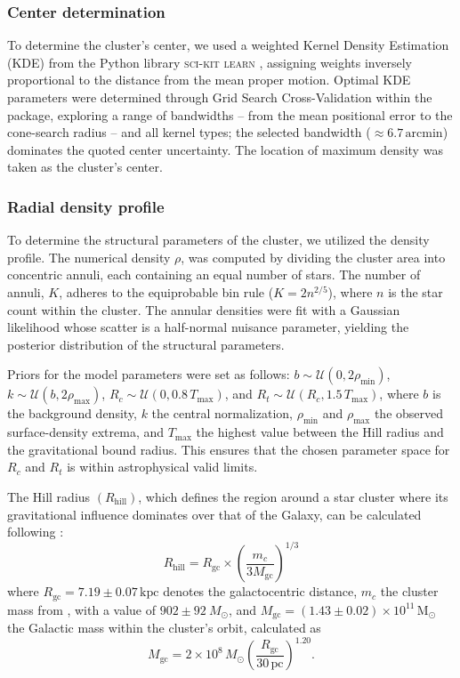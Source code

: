 \documentclass{aa}
\begin{document}
\subsubsection{Center determination}
To determine the cluster's center, we used a weighted Kernel Density Estimation (KDE) from the Python library \textsc{sci-kit learn} \citep{scikit-learn}, assigning weights inversely proportional to the distance from the mean proper motion. Optimal KDE parameters were determined through Grid Search Cross-Validation within the package, exploring a range of bandwidths -- from the mean positional error to the cone-search radius -- and all kernel types; the selected bandwidth ($\approx6.7\,\mathrm{arcmin}$) dominates the quoted center uncertainty. The location of maximum density was taken as the cluster's center.

\subsubsection{Radial density profile}
To determine the structural parameters of the cluster, we utilized the \citet{1962AJ.....67..471K} density profile. The numerical density $\rho$, was computed by dividing the cluster area into concentric annuli, each containing an equal number of stars. The number of annuli, $K$, adheres to the equiprobable bin rule ($K = 2n^{2/5}$), where $n$ is the star count within the cluster. The annular densities were fit with a Gaussian likelihood whose scatter is a half-normal nuisance parameter, yielding the posterior distribution of the structural parameters.

Priors for the model parameters were set as follows: $b \sim \mathcal{U}(0, 2\rho_{\mathrm{min}})$, $k \sim \mathcal{U}(b, 2\rho_{\mathrm{max}})$, $R_c \sim \mathcal{U}(0, 0.8\,T_{\mathrm{max}})$, and $R_t \sim \mathcal{U}(R_c, 1.5\,T_{\mathrm{max}})$, where $b$ is the background density, $k$ the central normalization, $\rho_{\mathrm{min}}$ and $\rho_{\mathrm{max}}$ the observed surface-density extrema, and $T_{\mathrm{max}}$ the highest value between the Hill radius and the gravitational bound radius. This ensures that the chosen parameter space for $R_c$ and $R_t$ is within astrophysical valid limits.

The Hill radius $(R_\mathrm{hill})$, which defines the region around a star cluster where its gravitational influence dominates over that of the Galaxy, can be calculated following \citet{2019A&A...627A.119C}:
\begin{equation}
R_\mathrm{hill} = R_{\mathrm{gc}} \times \left(\frac{m_c}{3M_{\mathrm{gc}}}\right)^{1/3}
\end{equation}
where $ R_{\mathrm{gc}} = 7.19 \pm 0.07\,\mathrm{kpc} $ denotes the galactocentric distance, $ m_c $ the cluster mass from \citet{2024arXiv240305143H}, with a value of $902 \pm 92~M_\odot$, and $ M_{\mathrm{gc}} = (1.43 \pm 0.02) \times 10^{11}\,\mathrm{M_{\odot}} $ the Galactic mass within the cluster's orbit, calculated as
\begin{equation}
	M_{\mathrm{gc}} = 2  \times 10^8\,M_\odot \left(\frac{R_{\mathrm{gc}}}{30\,\mathrm{pc}}\right)^{1.20}.
\end{equation}
\end{document}
